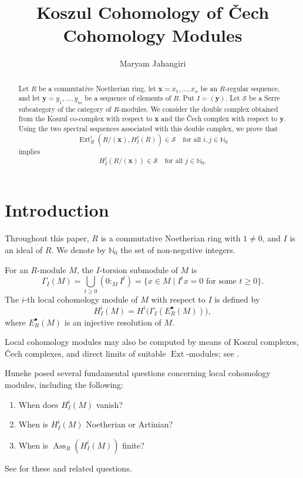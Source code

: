 \documentclass[12pt,twoside, final]{amsart}
\title{Koszul Cohomology of \v{C}ech Cohomology Modules}
\author{Maryam Jahangiri}
\numberwithin{equation}{section}
\theoremstyle{definition}
\newcommand{\Ass}{\operatorname{Ass}}
\newcommand{\Ext}{\operatorname{Ext}}
\newcommand{\NN}{\mathbb N_0}
\begin{document}
\maketitle

\begin{abstract}
Let $R$ be a commutative Noetherian ring, let
$\mathbf{x}=x_1,\ldots,x_n$ be an $R$-regular sequence, and let
$\mathbf{y}=y_1,\ldots,y_m$ be a sequence of elements of $R$. Put
$I=(\mathbf y)$. Let $\mathcal S$ be a Serre subcategory of the
category of $R$-modules. We consider the double complex obtained from
the Koszul co-complex with respect to $\mathbf x$ and the \v{C}ech
complex with respect to $\mathbf y$. Using the two spectral sequences
associated with this double complex, we prove that
\[
\Ext_R^i(R/(\mathbf x),H_I^j(R))\in\mathcal S
\quad\text{for all }i,j\in\NN
\]
implies
\[
H_I^j(R/(\mathbf x))\in\mathcal S
\quad\text{for all }j\in\NN.
\]
\end{abstract}

\section{Introduction}

Throughout this paper, $R$ is a commutative Noetherian ring with
$1\ne0$, and $I$ is an ideal of $R$. We denote by $\NN$ the set of
non-negative integers.

For an $R$-module $M$, the $I$-torsion submodule of $M$ is
\[
\Gamma_I(M)
=
\bigcup_{t\geq 0}(0:_M I^t)
=
\{x\in M\mid I^t x=0\text{ for some }t\geq0\}.
\]
The $i$-th local cohomology module of $M$ with respect to $I$ is
defined by
\[
H_I^i(M)
=
H^i\bigl(\Gamma_I(E_R^\bullet(M))\bigr),
\]
where $E_R^\bullet(M)$ is an injective resolution of $M$.

Local cohomology modules may also be computed by means of Koszul
complexes, \v{C}ech complexes, and direct limits of suitable
$\Ext$-modules; see \cite[Chapters 1 and 5]{BS}.

Huneke posed several fundamental questions concerning local
cohomology modules, including the following:
\begin{enumerate}%
\item When does $H_I^i(M)$ vanish?
\item When is $H_I^i(M)$ Noetherian or Artinian?
\item When is $\Ass_R(H_I^i(M))$ finite?
\end{enumerate}
See \cite{Huneke} for these and related questions.
\end{document}
